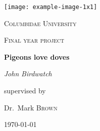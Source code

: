 \documentclass[12pt,a4paper]{report}
\begin{document}
\begin{titlepage}
	\centering
	\texttt{[image: example-image-1x1]}\par\vspace{1cm}
	{\scshape\LARGE Columbidae University \par}
	\vspace{1cm}
	{\scshape\Large Final year project\par}
	\vspace{1.5cm}
	{\huge\bfseries Pigeons love doves\par}
	\vspace{2cm}
	{\Large\itshape John Birdwatch\par}
	\vfill
	supervised by\par
	Dr.~Mark \textsc{Brown}

	\vfill

	{\large \today\par}
\end{titlepage}
\end{document}
